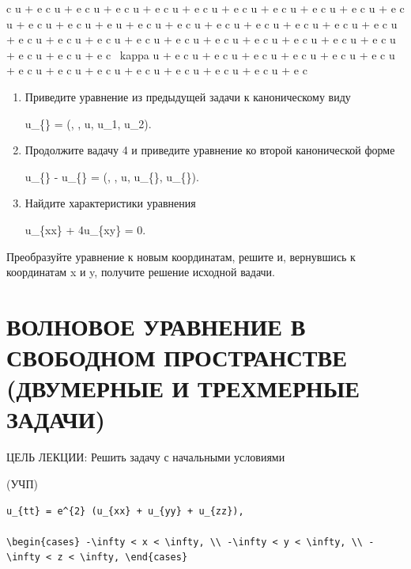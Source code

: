 \documentclass[
  ukrainian,
]{article}
\begin{document}
c \kappa u + e c \kappa u + e c \kappa u + e c \kappa u + e c \kappa u +
e c \kappa u + e c \kappa u + e c \kappa u + e c \kappa u + e c \kappa u
+ e c \kappa u + e c \kappa u + e c \kappa u + e u + e c \kappa u + e c
\kappa u + e c \kappa u + e c \kappa u + e c \kappa u + e c \kappa u + e
c \kappa u + e c \kappa u + e c \kappa u + e c \kappa u + e c \kappa u +
e c \kappa u + e c \kappa u + e c \kappa u + e c \kappa u + e c \kappa u
+ e c \kappa u + e c \kappa u + e c \kappa u + e c ~kappa u + e c
\kappa u + e c \kappa u + e c \kappa u + e c \kappa u + e c \kappa u + e
c \kappa u + e c \kappa u + e c \kappa u + e c \kappa u + e c \kappa u +
e c \kappa u + e c \kappa u + e c \kappa u + e c

\begin{enumerate}
\def\labelenumi{\arabic{enumi}.}
\setcounter{enumi}{3}
\item
  Приведите уравнение из предыдущей задачи к каноническому виду

  u\_\{\xi\eta\} = \Phi(\xi, \eta, u, u\_1, u\_2).
\item
  Продолжите вадачу 4 и приведите уравнение ко второй канонической форме

  u\_\{\alpha\alpha\} - u\_\{\beta\beta\} = \Psi(\alpha, \beta, u,
  u\_\{\alpha\}, u\_\{\beta\}).
\item
  Найдите характеристики уравнения

  u\_\{xx\} + 4u\_\{xy\} = 0.
\end{enumerate}

Преобразуйте уравнение к новым координатам, решите и, вернувшись к
координатам x и y, получите решение исходной вадачи.

\section{ВОЛНОВОЕ УРАВНЕНИЕ В СВОБОДНОМ ПРОСТРАНСТВЕ (ДВУМЕРНЫЕ И
ТРЕХМЕРНЫЕ
ЗАДАЧИ)}\label{ux432ux43eux43bux43dux43eux432ux43eux435-ux443ux440ux430ux432ux43dux435ux43dux438ux435-ux432-ux441ux432ux43eux431ux43eux434ux43dux43eux43c-ux43fux440ux43eux441ux442ux440ux430ux43dux441ux442ux432ux435-ux434ux432ux443ux43cux435ux440ux43dux44bux435-ux438-ux442ux440ux435ux445ux43cux435ux440ux43dux44bux435-ux437ux430ux434ux430ux447ux438}

ЦЕЛЬ ЛЕКЦИИ: Решить задачу с начальными условиями

(УЧП)

\begin{verbatim}
u_{tt} = e^{2} (u_{xx} + u_{yy} + u_{zz}),

\begin{cases} -\infty < x < \infty, \\ -\infty < y < \infty, \\ -\infty < z < \infty, \end{cases}
\end{verbatim}
\end{document}
